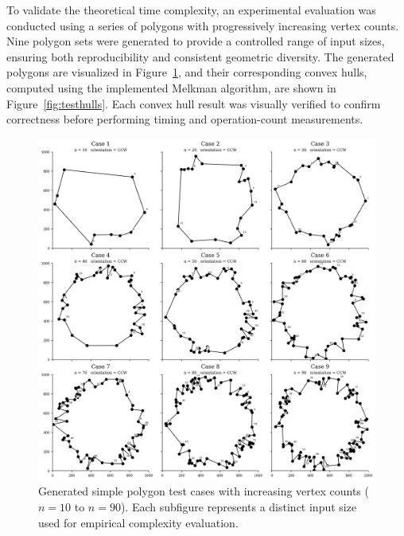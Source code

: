 \documentclass{article}
\begin{document}
To validate the theoretical time complexity, an experimental evaluation was conducted using a series of polygons with progressively increasing vertex counts. 
Nine polygon sets were generated to provide a controlled range of input sizes, ensuring both reproducibility and consistent geometric diversity. 
The generated polygons are visualized in Figure~\ref{fig:testpolys}, and their corresponding convex hulls, computed using the implemented Melkman algorithm, are shown in Figure~\ref{fig:testhulls}. 
Each convex hull result was visually verified to confirm correctness before performing timing and operation-count measurements.

\begin{figure}[H]
    \centering
    \includegraphics[width=0.95\linewidth]{Pictures/test_polygon_cases.png}
    \caption{Generated simple polygon test cases with increasing vertex counts ($n=10$ to $n=90$). 
    Each subfigure represents a distinct input size used for empirical complexity evaluation.}
    \label{fig:testpolys}
\end{figure}
\end{document}
